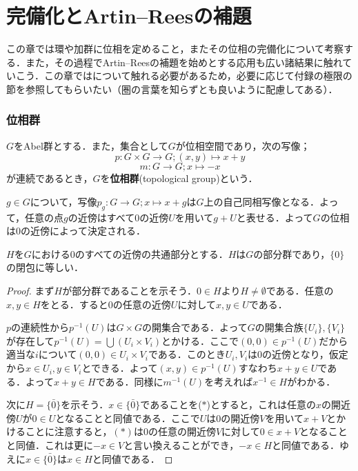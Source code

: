 \part[completion，and Artin--Rees lemma]{完備化とArtin--Reesの補題}

この章では環や加群に位相を定めること，またその位相の完備化について考察する．また，その過程でArtin--Reesの補題を始めとする応用も広い諸結果に触れていこう．この章ではについて触れる必要があるため，必要に応じて付録の極限の節を参照してもらいたい（圏の言葉を知らずとも良いように配慮してある）．
\section{位相群}

\begin{defi}[位相群]
	$G$をAbel群とする．また，集合として$G$が位相空間であり，次の写像；
	\[p:G\times G\to G;(x,y)\mapsto x+y\]
	\[m:G\to G;x\mapsto -x\]
	が連続であるとき，$G$を\textbf{位相群}(topological group)という．
\end{defi}

$g\in G$について，写像$p_g:G\to G;x\mapsto x+g$は$G$上の自己同相写像となる．よって，任意の点$g$の近傍はすべて$0$の近傍$U$を用いて$g+U$と表せる．よって$G$の位相は$0$の近傍によって決定される．

\begin{prop}
	$H$を$G$における$0$のすべての近傍の共通部分とする．$H$は$G$の部分群であり，$\{0\}$の閉包に等しい．
\end{prop}

\begin{proof}
	まず$H$が部分群であることを示そう．$0\in H$より$H\neq\emptyset$である．任意の$x,y\in H$をとる．すると$0$の任意の近傍$U$に対して$x,y\in U$である．
	
	$p$の連続性から$p^{-1}(U)$は$G\times G$の開集合である．よって$G$の開集合族$\{U_i\},\{V_i\}$が存在して$p^{-1}(U)=\bigcup (U_i\times V_i)$とかける．ここで$(0,0)\in p^{-1}(U)$だから適当な$i$について$(0,0)\in U_i\times V_i$である．このとき$U_i,V_i$は$0$の近傍となり，仮定から$x\in U_i,y\in V_i$とできる．よって$(x,y)\in p^{-1}(U)$すなわち$x+y\in U$である．よって$x+y\in H$である．同様に$m^{-1}(U)$を考えれば$x^{-1}\in H$がわかる．
	
	次に$H=\bar{\{0\}}$を示そう．$x\in\bar{\{0\}}$であることを($\ast$)とすると，これは任意の$x$の開近傍$U$が$0\in U$となることと同値である．ここで$U$は$0$の開近傍$V$を用いて$x+V$とかけることに注意すると，$(\ast)$は$0$の任意の開近傍$V$に対して$0\in x+V$となることと同値．これは更に$-x\in V$と言い換えることができ，$-x\in H$と同値である．ゆえに$x\in\bar{\{0\}}$は$x\in H$と同値である．
\end{proof}

